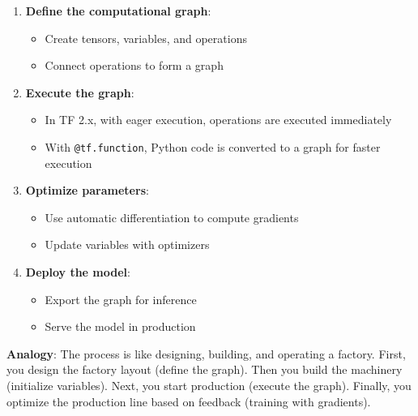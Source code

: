 \documentclass[
  letterpaper,
  DIV=11,
  numbers=noendperiod]{scrreprt}
\providecommand{\tightlist}{%
  \setlength{\itemsep}{0pt}\setlength{\parskip}{0pt}}\usepackage{longtable,booktabs,array}
\begin{document}
\begin{enumerate}
\def\labelenumi{\arabic{enumi}.}
\tightlist
\item
  \textbf{Define the computational graph}:

  \begin{itemize}
  \tightlist
  \item
    Create tensors, variables, and operations
  \item
    Connect operations to form a graph
  \end{itemize}
\item
  \textbf{Execute the graph}:

  \begin{itemize}
  \tightlist
  \item
    In TF 2.x, with eager execution, operations are executed immediately
  \item
    With \texttt{@tf.function}, Python code is converted to a graph for
    faster execution
  \end{itemize}
\item
  \textbf{Optimize parameters}:

  \begin{itemize}
  \tightlist
  \item
    Use automatic differentiation to compute gradients
  \item
    Update variables with optimizers
  \end{itemize}
\item
  \textbf{Deploy the model}:

  \begin{itemize}
  \tightlist
  \item
    Export the graph for inference
  \item
    Serve the model in production
  \end{itemize}
\end{enumerate}

\textbf{Analogy}: The process is like designing, building, and operating
a factory. First, you design the factory layout (define the graph). Then
you build the machinery (initialize variables). Next, you start
production (execute the graph). Finally, you optimize the production
line based on feedback (training with gradients).
\end{document}
